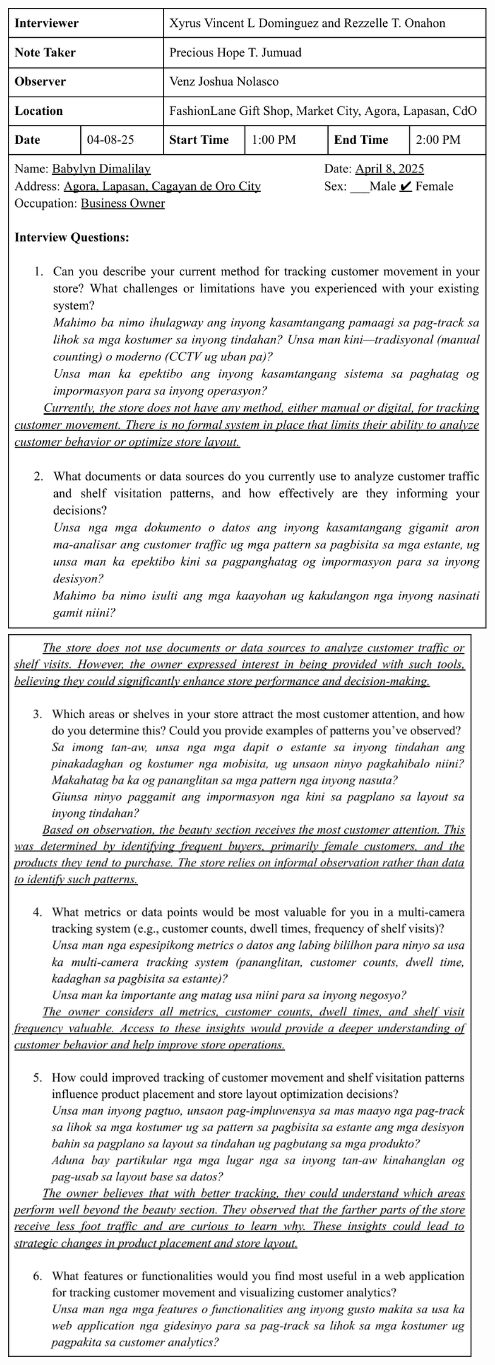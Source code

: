 \begin{center}
	\includegraphics[width=0.95\textwidth]{app/D1.pdf}
	\includegraphics[width=0.92\textwidth]{app/D2.pdf}

\end{center}
